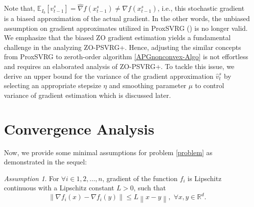 \documentclass{article}
\newcommand*{\R}{\mathbb{R}}
\newcommand*{\E}{\mathbb{E}}
\newcommand{\norm}[1]{\left\lVert#1\right\rVert}
\theoremstyle{definition}
\theoremstyle{remark}
\newtheorem{assumption}[theorem]{Assumption}
\begin{document}
Note that, $\E_{I_b}[\hat{v}_{t-1}^s] = \hat{\nabla} f(x_{t-1}^s) \neq {\nabla} f(x_{t-1}^s)$, i.e., this stochastic gradient is a biased approximation of the actual gradient.
In the other words, the unbiased assumption on gradient approximates utilized in ProxSVRG (\cite{reddi2016proximal,li2018simple}) is no longer valid. We emphasize that the biased ZO gradient estimation yields a fundamental challenge in the analyzing ZO-PSVRG+.
Hence, adjusting the similar concepts from ProxSVRG to zeroth-order algorithm \ref{APGnonconvex-Algo} is not effortless and requires an elaborated analysis of ZO-PSVRG+. To tackle this issue, we derive an upper bound for the variance of the gradient approximation $\hat{v}_t^s$ by selecting an appropriate stepsize $\eta$ and smoothing parameter $\mu$ to control
variance of gradient estimation which is discussed later.

\section{Convergence Analysis}
Now, we provide some
minimal assumptions for problem \eqref{problem} as demonstrated in the sequel:
\begin{assumption}\label{Lip-Zoo}
For $\forall i\in{1,2,\ldots,n}$, gradient of the function $f_i$ is Lipschitz continuous with a Lipschitz constant $L > 0$, such that 
\[
\norm{\nabla f_i(x) - \nabla f_i(y)}\leq L \norm{x-y},\,\,\forall x,y\in\R^d.
\]
\end{assumption}
\end{document}
